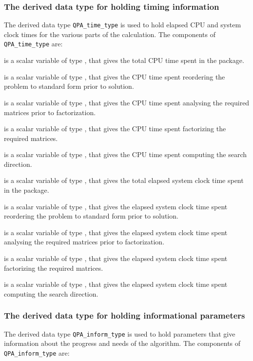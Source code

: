 \documentclass{galahad}
\newcommand{\packagename}{QPA}
\begin{document}
\subsubsection{The derived data type for holding timing 
 information}\label{typetime}
The derived data type 
{\tt \packagename\_time\_type} 
is used to hold elapsed CPU and system clock times for the various parts of 
the calculation. The components of 
{\tt \packagename\_time\_type} 
are:
\begin{description}
 is a scalar variable of type \realdp, that gives
 the total CPU time spent in the package.

 is a scalar variable of type \realdp, that gives
 the CPU time spent reordering the problem to standard form prior to solution.

 is a scalar variable of type \realdp, that gives
 the CPU time spent analysing the required matrices prior to factorization.

 is a scalar variable of type \realdp, that gives
 the CPU time spent factorizing the required matrices.

 is a scalar variable of type \realdp, that gives
 the CPU time spent computing the search direction.

 is a scalar variable of type \realdp, that gives
 the total elapsed system clock time spent in the package.

 is a scalar variable of type \realdp, that gives
 the elapsed system clock time spent reordering the problem to standard form 
prior to solution.

 is a scalar variable of type \realdp, that gives
 the elapsed system clock time spent analysing the required matrices prior to 
factorization.

 is a scalar variable of type \realdp, that gives
 the elapsed system clock time spent factorizing the required matrices.

 is a scalar variable of type \realdp, that gives
 the elapsed system clock time spent computing the search direction.

\end{description}


\subsubsection{The derived data type for holding informational
 parameters}\label{typeinform}
The derived data type 
{\tt \packagename\_inform\_type} 
is used to hold parameters that give information about the progress and needs 
of the algorithm. The components of 
{\tt \packagename\_inform\_type} 
are:
\end{document}
